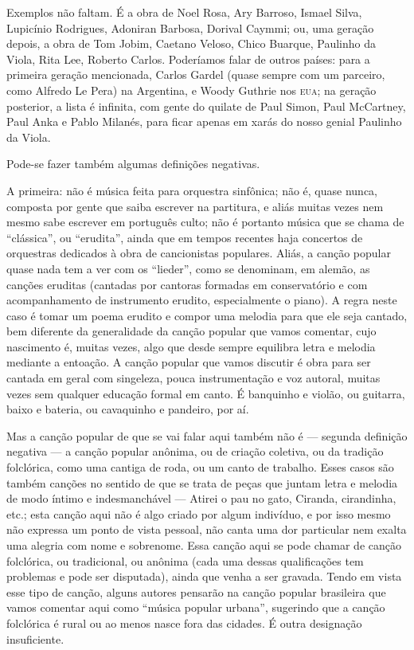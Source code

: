 Exemplos não faltam. É a obra de Noel Rosa, Ary Barroso, Ismael Silva,
Lupicínio Rodrigues, Adoniran Barbosa, Dorival Caymmi; ou, uma geração
depois, a obra de Tom Jobim, Caetano Veloso, Chico Buarque, Paulinho da
Viola, Rita Lee, Roberto Carlos. Poderíamos falar de outros países: para
a primeira geração mencionada, Carlos Gardel (quase sempre com um
parceiro, como Alfredo Le Pera) na Argentina, e Woody Guthrie nos \textsc{eua};
na geração posterior, a lista é infinita, com gente do quilate de Paul
Simon, Paul McCartney, Paul Anka e Pablo Milanés, para ficar apenas em
xarás do nosso genial Paulinho da Viola.

Pode-se fazer também algumas definições negativas.

A primeira: não é música feita para orquestra sinfônica; não é, quase
nunca, composta por gente que saiba escrever na partitura, e aliás
muitas vezes nem mesmo sabe escrever em português culto; não é portanto
música que se chama de ``clássica'', ou ``erudita'', ainda que em tempos
recentes haja concertos de orquestras dedicados à obra de cancionistas
populares. Aliás, a canção popular quase nada tem a ver com os
``lieder'', como se denominam, em alemão, as canções eruditas (cantadas
por cantoras formadas em conservatório e com acompanhamento de
instrumento erudito, especialmente o piano). A regra neste caso é tomar
um poema erudito e compor uma melodia para que ele seja cantado, bem
diferente da generalidade da canção popular que vamos comentar, cujo
nascimento é, muitas vezes, algo que desde sempre equilibra letra e
melodia mediante a entoação. A canção popular que vamos discutir é obra
para ser cantada em geral com singeleza, pouca instrumentação e voz
autoral, muitas vezes sem qualquer educação formal em canto. É banquinho
e violão, ou guitarra, baixo e bateria, ou cavaquinho e pandeiro, por
aí.

Mas a canção popular de que se vai falar aqui também não é --- segunda
definição negativa --- a canção popular anônima, ou de criação coletiva,
ou da tradição folclórica, como uma cantiga de roda, ou um canto de
trabalho. Esses casos são também canções no sentido de que se trata de
peças que juntam letra e melodia de modo íntimo e indesmanchável ---
Atirei o pau no gato, Ciranda, cirandinha, etc.; esta canção aqui não é
algo criado por algum indivíduo, e por isso mesmo não expressa um ponto
de vista pessoal, não canta uma dor particular nem exalta uma alegria
com nome e sobrenome. Essa canção aqui se pode chamar de canção
folclórica, ou tradicional, ou anônima (cada uma dessas qualificações
tem problemas e pode ser disputada), ainda que venha a ser gravada.
Tendo em vista esse tipo de canção, alguns autores pensarão na canção
popular brasileira que vamos comentar aqui como ``música popular
urbana'', sugerindo que a canção folclórica é rural ou ao menos nasce
fora das cidades. É outra designação insuficiente.


